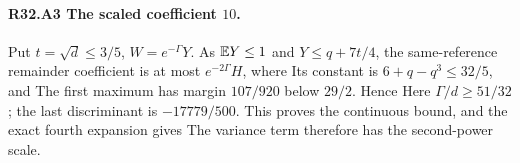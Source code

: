 \paragraph{R32.A3 The scaled coefficient \(10\).}
Put \(t=\sqrt d\le3/5\), \(W=e^{-\Gamma}Y\). As \(\mathbb E Y\le1\) and
\(Y\le q+7t/4\), the same-reference remainder coefficient is at most
\(e^{-2\Gamma}H\), where
Its constant is \(6+q-q^3\le32/5\), and
The first maximum has margin \(107/920\) below \(29/2\). Hence
Here \(\Gamma/d\ge51/32\); the last discriminant is \(-17779/500\).
This proves the continuous bound, and the exact fourth expansion gives
The variance term therefore has the second-power scale.

